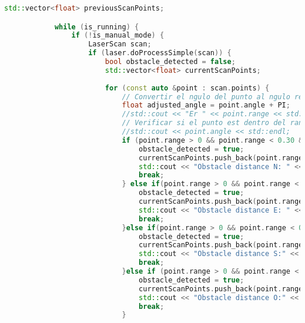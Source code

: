 \begin{lstlisting}[language={C++}, caption={Primera versi\'on del c\'odigo del sistema de control del robot}, label={Script}]
            std::vector<float> previousScanPoints;

            while (is_running) {
                if (!is_manual_mode) {
                    LaserScan scan;
                    if (laser.doProcessSimple(scan)) {
                        bool obstacle_detected = false;
                        std::vector<float> currentScanPoints;
                        
                        for (const auto &point : scan.points) {
                            // Convertir el ngulo del punto al ngulo relativo al "sur" del robot
                            float adjusted_angle = point.angle + PI;
                            //std::cout << "Er " << point.range << std::endl;
                            // Verificar si el punto est dentro del rango frontal de 30
                            //std::cout << point.angle << std::endl;
                            if (point.range > 0 && point.range < 0.30 && ( point.angle <= -0.5235f  && point.angle >= -2.617f)) { // Norte
                                obstacle_detected = true;
                                currentScanPoints.push_back(point.range);
                                std::cout << "Obstacle distance N: " << (float)point.range  << " Y en el angulo  "<<point.angle << std::endl;
                                break;
                            } else if(point.range > 0 && point.range < 0.25 && (point.angle <= 0.872f  && point.angle>= -0.5235f)){ // Este
                                obstacle_detected = true;
                                currentScanPoints.push_back(point.range);
                                std::cout << "Obstacle distance E: " << (float)point.range  << " Y en el angulo  "<<point.angle << std::endl;
                                break;
                            }else if(point.range > 0 && point.range < 0.45 && (point.angle <= 2.26f && point.angle >= 0.872f)){ // Sur
                                obstacle_detected = true;
                                currentScanPoints.push_back(point.range);
                                std::cout << "Obstacle distance S:" << (float)point.range  << " Y en el angulo  "<<point.angle << std::endl;
                                break;
                            }else if (point.range > 0 && point.range < 0.25 && (point.angle <= -2.61f  || point.angle >= 2.27f)){ // Oeste
                                obstacle_detected = true;
                                currentScanPoints.push_back(point.range);
                                std::cout << "Obstacle distance O:" << (float)point.range  << " Y en el angulo  "<<point.angle << std::endl;
                                break;
                            }
                            

\end{lstlisting}

